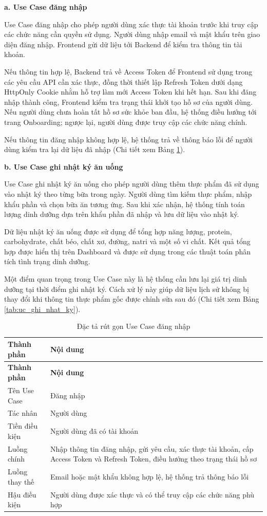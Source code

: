 \documentclass[12pt, a4paper]{report}
\begin{document}
\textbf{a. Use Case đăng nhập}

Use Case đăng nhập cho phép người dùng xác thực tài khoản trước khi truy cập các chức năng cần quyền sử dụng. Người dùng nhập email và mật khẩu trên giao diện đăng nhập. Frontend gửi dữ liệu tới Backend để kiểm tra thông tin tài khoản.

Nếu thông tin hợp lệ, Backend trả về Access Token để Frontend sử dụng trong các yêu cầu API cần xác thực, đồng thời thiết lập Refresh Token dưới dạng HttpOnly Cookie nhằm hỗ trợ làm mới Access Token khi hết hạn. Sau khi đăng nhập thành công, Frontend kiểm tra trạng thái khởi tạo hồ sơ của người dùng. Nếu người dùng chưa hoàn tất hồ sơ sức khỏe ban đầu, hệ thống điều hướng tới trang Onboarding; ngược lại, người dùng được truy cập các chức năng chính.

Nếu thông tin đăng nhập không hợp lệ, hệ thống trả về thông báo lỗi để người dùng kiểm tra lại dữ liệu đã nhập (Chi tiết xem Bảng \ref{tab:uc_dang_nhap}).

\textbf{b. Use Case ghi nhật ký ăn uống}

Use Case ghi nhật ký ăn uống cho phép người dùng thêm thực phẩm đã sử dụng vào nhật ký theo từng bữa trong ngày. Người dùng tìm kiếm thực phẩm, nhập khẩu phần và chọn bữa ăn tương ứng. Sau khi xác nhận, hệ thống tính toán lượng dinh dưỡng dựa trên khẩu phần đã nhập và lưu dữ liệu vào nhật ký.

Dữ liệu nhật ký ăn uống được sử dụng để tổng hợp năng lượng, protein, carbohydrate, chất béo, chất xơ, đường, natri và một số vi chất. Kết quả tổng hợp được hiển thị trên Dashboard và được sử dụng trong các thuật toán phân tích tình trạng dinh dưỡng.

Một điểm quan trọng trong Use Case này là hệ thống cần lưu lại giá trị dinh dưỡng tại thời điểm ghi nhật ký. Cách xử lý này giúp dữ liệu lịch sử không bị thay đổi khi thông tin thực phẩm gốc được chỉnh sửa sau đó (Chi tiết xem Bảng \ref{tab:uc_ghi_nhat_ky}).

\begin{longtable}{|>{\raggedright\arraybackslash}p{5cm}|p{10cm}|}
\caption{Đặc tả rút gọn Use Case đăng nhập}
\label{tab:uc_dang_nhap} \\
\hline
\textbf{Thành phần} & \textbf{Nội dung} \\
\hline
\endfirsthead
\hline
\textbf{Thành phần} & \textbf{Nội dung} \\
\hline
\endhead

Tên Use Case & Đăng nhập \\
\hline
Tác nhân & Người dùng \\
\hline
Tiền điều kiện & Người dùng đã có tài khoản \\
\hline
Luồng chính & Nhập thông tin đăng nhập, gửi yêu cầu, xác thực tài khoản, cấp Access Token và Refresh Token, điều hướng theo trạng thái hồ sơ \\
\hline
Luồng thay thế & Email hoặc mật khẩu không hợp lệ, hệ thống trả thông báo lỗi \\
\hline
Hậu điều kiện & Người dùng được xác thực và có thể truy cập các chức năng phù hợp \\
\hline
\end{longtable}
\end{document}
